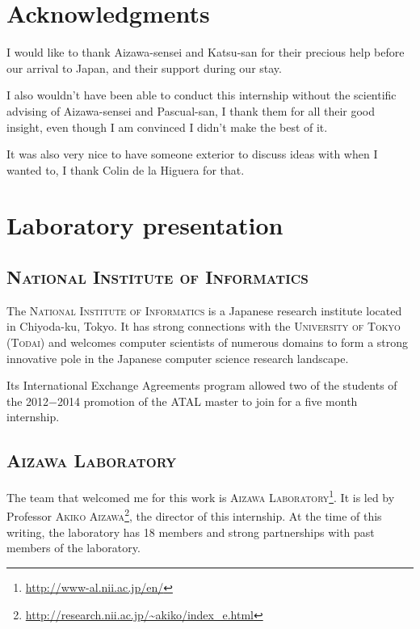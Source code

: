 \documentclass[a4paper, 11pt, onepage]{scrreprt}
\begin{document}
\tableofcontents

\chapter{Acknowledgments}

I would like to thank Aizawa-sensei and Katsu-san for their precious
help before our arrival to Japan, and their support during our stay.

I also wouldn't have been able to conduct this internship without the
scientific advising of Aizawa-sensei and Pascual-san, I thank them for
all their good insight, even though I am convinced I didn't make the
best of it.

It was also very nice to have someone exterior to discuss ideas with
when I wanted to, I thank Colin de la Higuera for that.

\chapter{Laboratory presentation}

\section{\textsc{National Institute of Informatics}}
\label{sec:national-institute-of-informatics}

The \textsc{National Institute of Informatics} is a Japanese research
institute located in Chiyoda-ku, Tokyo. It has strong connections with
the \textsc{University of Tokyo} (\textsc{Todai}) and welcomes
computer scientists of numerous domains to form a strong innovative
pole in the Japanese computer science research landscape.

Its International Exchange Agreements program allowed two of the
students of the 2012−2014 promotion of the ATAL master to join for a
five month internship.

\section{\textsc{Aizawa Laboratory}}
\label{sec:aizawa-laboratory}

The team that welcomed me for this work is \textsc{Aizawa
  Laboratory}\footnote{\url{http://www-al.nii.ac.jp/en/}}. It is led
by Professor \textsc{Akiko
  Aizawa}\footnote{\url{http://research.nii.ac.jp/~akiko/index_e.html}},
the director of this internship. At the time of this writing, the
laboratory has 18 members and strong partnerships with past members of
the laboratory.
\end{document}
